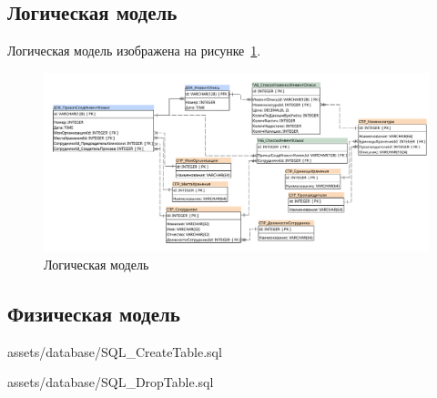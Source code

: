 \newpage
\subsection{Логическая модель}

Логическая модель 
изображена на рисунке~\ref{fig:ArchitectureDatabase}.

\begin{figure}[!h]
    \centering

    \includegraphics[width=22cm, angle=90]
    {assets/database/ArchitectureDatabase.architect.pdf}

    \caption{Логическая модель}

    \label{fig:ArchitectureDatabase}
\end{figure}

\newpage
\subsection{Физическая модель}


{assets/database/SQL_CreateTable.sql}

\newpage


{assets/database/SQL_DropTable.sql}

\newpage
